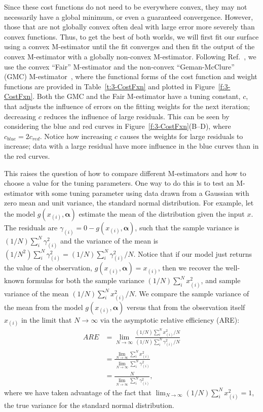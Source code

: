 Since these cost functions do not need to be everywhere convex, they may not necessarily have a global minimum, or even a guaranteed convergence.
However, those that are not globally convex often deal with large error more severely than convex functions.
Thus, to get the best of both worlds, we will first fit our surface using a convex M-estimator until the fit converges and then fit the output of the convex M-estimator with a globally non-convex M-estimator.
Following Ref.~\cite{RN31}, we use the convex ``Fair'' M-estimator and the non-convex ``Geman-McClure'' (GMC) M-estimator~\cite{RN52}, where the functional forms of the cost function and weight functions are provided in Table~\ref{t:3-CostFxn} and plotted in Figure~\ref{f:3-CostFxn}.
Both the GMC and the Fair M-estimator have a tuning constant, $c$, that adjusts the influence of errors on the fitting weights for the next iteration; decreasing $c$ reduces the influence of large residuals.
This can be seen by considering the blue and red curves in Figure~\ref{f:3-CostFxn}(B--D), where $c_{blue} = 2c_{red}$.
Notice how increasing $c$ causes the weights for large residuals to increase; data with a large residual have more influence in the blue curves than in the red curves.

This raises the question of how to compare different M-estimators and how to choose a value for the tuning parameters.
One way to do this is to test an M-estimator with some tuning parameter using data drawn from a Gaussian with zero mean and unit variance, the standard normal distribution.
For example, let the model $g(x_{(i)},\bm{\alpha})$ estimate the mean of the distribution given the input $x$.
The residuals are $\gamma_{(i)} = 0 - g(x_{(i)},\bm{\alpha})$, such that the sample variance is $(1/N)\sum_i^N \gamma_{(i)}^2$ and the variance of the mean is $(1/N^2)\sum_i^N \gamma_{(i)}^2 = (1/N)\sum_i^N \gamma_{(i)}^2/N$.
Notice that if our model just returns the value of the observation, $g(x_{(i)},\bm{\alpha}) = x_{(i)}$, then we recover the well-known formulas for both the sample variance $(1/N)\sum_i^N x_{(i)}^2$, and sample variance of the mean $(1/N)\sum_i^N x_{(i)}^2/N$.
We compare the sample variance of the mean from the model $g(x_{(i)},\bm{\alpha})$ versus that from the observation itself $x_{(i)}$ in the limit that $N \to \infty$ via the asymptotic relative efficiency (ARE):
\begin{align}
  ARE &= \lim_{N \to \infty} \frac{(1/N)\sum\limits_i^N x_{(i)}^2/N}{(1/N)\sum\limits_i^N \gamma_{(i)}^2/N}\\
  &= \frac{\lim_{N \to \infty} \sum\limits_i^N x_{(i)}^2}{\lim_{N \to \infty} \sum\limits_i^N \gamma_{(i)}^2}\\
  &= \frac{N}{\lim_{N \to \infty} \sum\limits_i^N \gamma_{(i)}^2},
\end{align}
where we have taken advantage of the fact that $\lim_{N \to \infty} (1/N)\sum_i^N x_{(i)}^2 = 1$, the true variance for the standard normal distribution.

